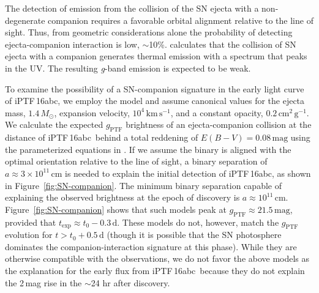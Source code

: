 \documentclass[twocolumn]{aastex61}
\newcommand{\sm}{M_\odot}
\newcommand{\abc}{iPTF\,16abc}
\begin{document}
The detection of emission from the collision of the SN ejecta with a
non-degenerate companion requires a favorable orbital alignment relative to
the line of sight. Thus, from geometric considerations alone the probability
of detecting ejecta-companion interaction is low, $\sim$10\%.
\citet{2010ApJ...708.1025K} calculates that the collision of SN ejecta with a
companion generates thermal emission with a spectrum that peaks in the UV. The
resulting \textit{g}-band emission is expected to be weak.

To examine the possibility of a SN-companion signature in the early light
curve of \abc, we employ the \citet{2010ApJ...708.1025K} model and assume
canonical values for the ejecta mass, $1.4\,\sm$, expansion velocity,
$10^{4}\,\textrm{km}\,\textrm{s}^{-1}$, and a constant opacity,
$0.2\,\textrm{cm}^2\,\textrm{g}^{-1}$. We calculate the expected
$g_\mathrm{PTF}$ brightness of an ejecta-companion collision at the distance
of \abc\ behind a total reddening of $E(B-V) = 0.08 \, \mathrm{mag}$ using the
parameterized equations in \citet{2012ApJ...749...18B}. If we assume the
binary is aligned with the optimal orientation relative to the line of sight,
a binary separation of $a \approx 3 \times 10^{11}\, \mathrm{cm}$ is needed to
explain the initial detection of \abc, as shown in
Figure~\ref{fig:SN-companion}. The minimum binary separation capable of
explaining the observed brightness at the epoch of discovery is $a \approx
10^{11} \, \mathrm{cm}$. Figure~\ref{fig:SN-companion} shows that such models
peak at $g_\mathrm{PTF} \approx 21.5 \, \mathrm{mag}$, provided that
$t_\mathrm{exp} \approx t_0 - 0.3 \, \mathrm{d}$. These models do not,
however, match the $g_\mathrm{PTF}$ evolution for $t > t_0 + 0.5 \,
\mathrm{d}$ (though it is possible that the SN photosphere dominates the
companion-interaction signature at this phase). While they are otherwise
compatible with the observations, we do not favor the above models as the
explanation for the early flux from \abc\ because they do not explain the
2\,mag rise in the $\sim$24 hr after discovery.
\end{document}
